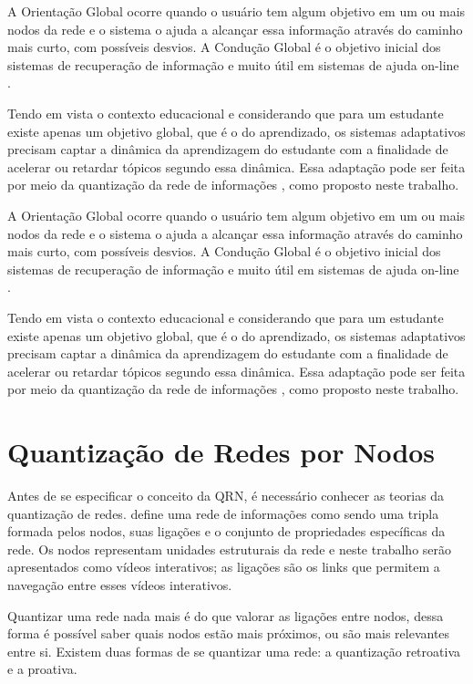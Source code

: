 A Orientação Global ocorre quando o usuário tem algum objetivo em um ou mais nodos da rede e o sistema o ajuda a alcançar essa informação através do caminho mais curto, com possíveis desvios. A Condução Global é o objetivo inicial dos sistemas de recuperação de informação e muito útil em sistemas de ajuda on-line \cite{brusilovsky1996, palazzo2000}.

Tendo em vista o contexto educacional e considerando que para um estudante existe apenas um objetivo global, que é o do aprendizado, os sistemas adaptativos precisam captar a dinâmica da aprendizagem do estudante com a finalidade de acelerar ou retardar tópicos segundo essa dinâmica. Essa adaptação pode ser feita por meio da quantização da rede de informações \cite{palazzo2000}, como proposto neste trabalho.

A Orientação Global ocorre quando o usuário tem algum objetivo em um ou mais nodos da rede e o sistema o ajuda a alcançar essa informação através do caminho mais curto, com possíveis desvios. A Condução Global é o objetivo inicial dos sistemas de recuperação de informação e muito útil em sistemas de ajuda on-line \cite{brusilovsky1996, palazzo2000}.

Tendo em vista o contexto educacional e considerando que para um estudante existe apenas um objetivo global, que é o do aprendizado, os sistemas adaptativos precisam captar a dinâmica da aprendizagem do estudante com a finalidade de acelerar ou retardar tópicos segundo essa dinâmica. Essa adaptação pode ser feita por meio da quantização da rede de informações \cite{palazzo2000}, como proposto neste trabalho.

\section{Quantização de Redes por Nodos}

Antes de se especificar o conceito da QRN, é necessário conhecer as teorias da quantização de redes.  define uma rede de informações como sendo uma tripla formada pelos nodos, suas ligações e o conjunto de propriedades específicas da rede. Os nodos representam unidades estruturais da rede e neste trabalho serão apresentados como vídeos interativos; as ligações são os links que permitem a navegação entre esses vídeos interativos.

Quantizar uma rede nada mais é do que valorar as ligações entre nodos, dessa forma é possível saber quais nodos estão mais próximos, ou são mais relevantes entre si. Existem duas formas de se quantizar uma rede: a quantização retroativa e a proativa. 

